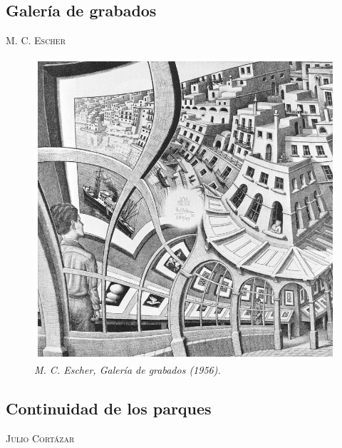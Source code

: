 \subsection {Galería de grabados}
\noindent \textsc{M. C. Escher}
\vspace{2cm}
\begin{figure}[H]
  \centering
    \includegraphics[width=1\textwidth]{c-ceb}
  \caption{\emph{M. C. Escher, \emph{Galería de grabados}  (1956).}}
  \label{ceb:galeria}
\end{figure}
\newpage
\subsection{Continuidad de los parques}
\begin{flushright}
\textsc{Julio Cortázar}
\end{flushright}
\bigskip

